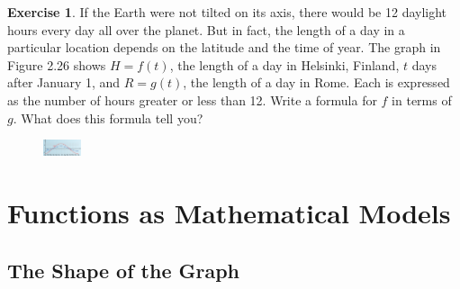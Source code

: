 \documentclass[10pt,]{book}
\theoremstyle{plain}
\theoremstyle{definition}
\newtheorem{exercise}[theorem]{Exercise}
\theoremstyle{definition}
\numberwithin{equation}{section}
\begin{document}
\begin{exercise}\label{daylight-hours}
If the Earth were not tilted on its axis, there would be 12 daylight hours every day all over the planet. But in fact, the length of a day in a particular location depends on the latitude and the time of year. The graph in Figure 2.26 shows \(H = f (t)\), the length of a day in Helsinki, Finland, \(t\) days after January 1, and \(R = g(t)\), the length of a day in Rome. Each is expressed as the number of hours greater or less than 12. Write a formula for \(f\) in terms of \(g\). What does this formula tell you?%
\leavevmode%
\begin{figure}
\centering
\includegraphics[width=0.100\textwidth,]{images/fig-daylight-hours.svg}\caption{\label{fig-daylight-hours}}
\end{figure}
\end{exercise}
\typeout{************************************************}
\typeout{************************************************}
\section[Functions as Mathematical Models]{Functions as Mathematical Models}\label{MathModels}
\typeout{************************************************}
\typeout{************************************************}
\subsection[The Shape of the Graph]{The Shape of the Graph}\label{subsection-45}
\end{document}
